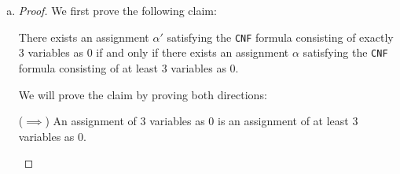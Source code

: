 \documentclass[11pt]{scrartcl}
\theoremstyle{dotlessP}
\theoremstyle{dotlessN}
\newcommand{\npc}{\texttt{NP}_\texttt{search}\text{-complete}}
\begin{document}
\begin{enumerate}[(a)]
\begin{proof}
\begin{enumerate}[1.]
\begin{subproof}
			As we have shown that $x_i = \neg x_i'$, it follows that, since the first $m$ clauses are the same as the clauses of $\varphi$ but the negations $\neg x_i$ replaced with $x_i'$, if we set $\alpha' \mid_\varphi = (a_0, \dots, a_{n-1})$, $\varphi$ will be satisfied. The removal of $\alpha_0', \dots, \alpha_{n-1}'$ takes polynomial time, as desired.
		\end{subproof}
	\end{enumerate}
		This completes the proof that \texttt{$k$-False PositiveMonotoneSAT} is $\npc$.
% 
		\end{proof}
	\item 
		\begin{proof}
			We first prove the following claim:
			\begin{claim*}
				There exists an assignment $\alpha'$ satisfying the \texttt{CNF} formula consisting of exactly 3 variables as 0 if and only if there exists an assignment $\alpha$ satisfying the \texttt{CNF} formula consisting of at least 3 variables as 0.
			\end{claim*}
			\begin{subproof}
				We will prove the claim by proving both directions:

				($\implies$) An assignment of 3 variables as 0 is an assignment of at least 3 variables as 0.


\end{subproof}
\end{proof}
\end{enumerate}
\end{document}
